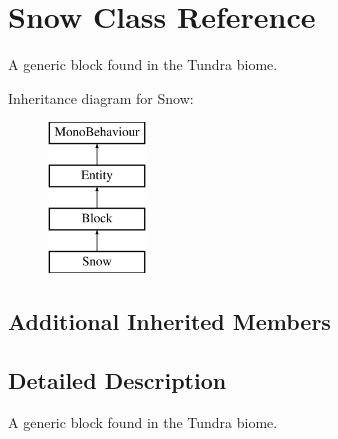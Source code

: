 \hypertarget{class_snow}{}\section{Snow Class Reference}
\label{class_snow}


A generic block found in the Tundra biome.  


Inheritance diagram for Snow\+:\begin{figure}[H]
\begin{center}
\leavevmode
\includegraphics[height=4.000000cm]{class_snow}
\end{center}
\end{figure}
\subsection*{Additional Inherited Members}


\subsection{Detailed Description}
A generic block found in the Tundra biome. 

